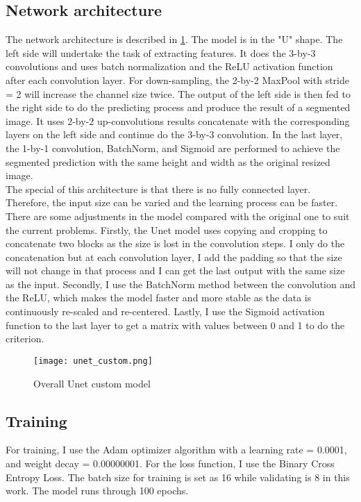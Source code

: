 \documentclass{article}
\begin{document}
\subsection{Network architecture} The network architecture is described in \ref{fig:Unet}. The model is in the "U" shape. The left side will undertake the task of extracting features. It does the 3-by-3 convolutions and uses batch normalization and the ReLU activation function after each convolution layer. For down-sampling, the 2-by-2 MaxPool with stride = 2 will increase the channel size twice. The output of the left side is then fed to the right side to do the predicting process and produce the result of a segmented image. It uses 2-by-2 up-convolutions results concatenate with the corresponding layers on the left side and continue do the 3-by-3 convolution. In the last layer, the 1-by-1 convolution, BatchNorm, and Sigmoid are performed to achieve the segmented prediction with the same height and width as the original resized image.\\ 
The special of this architecture is that there is no fully connected layer. Therefore, the input size can be varied and the learning process can be faster.\\
There are some adjustments in the model compared with the original one to suit the current problems. Firstly, the Unet model uses copying and cropping to concatenate two blocks as the size is lost in the convolution steps. I only do the concatenation but at each convolution layer, I add the padding so that the size will not change in that process and I can get the last output with the same size as the input. Secondly, I use the BatchNorm method between the convolution and the ReLU, which makes the model faster and more stable as the data is continuously re-scaled and re-centered. Lastly, I use the Sigmoid activation function to the last layer to get a matrix with values between 0 and 1 to do the criterion.
\begin{figure}
    \centering
    \texttt{[image: unet\_custom.png]}
    \caption{Overall Unet custom model}
    \label{fig:Unet}
\end{figure}

\subsection{Training}
For training, I use the Adam optimizer algorithm with a learning rate = 0.0001, and weight decay = 0.00000001. For the loss function, I use the Binary Cross Entropy Loss. The batch size for training is set as 16 while validating is 8 in this work. The model runs through 100 epochs.
\end{document}
